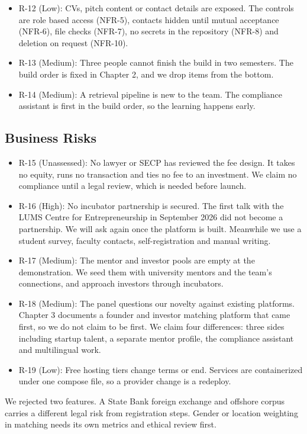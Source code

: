 \documentclass{FastFyp}
\begin{document}
\begin{itemize}
    \item R-12 (Low): CVs, pitch content or contact details are exposed. The controls are role based access (NFR-5), contacts hidden until mutual acceptance (NFR-6), file checks (NFR-7), no secrets in the repository (NFR-8) and deletion on request (NFR-10).
    \item R-13 (Medium): Three people cannot finish the build in two semesters. The build order is fixed in Chapter 2, and we drop items from the bottom.
    \item R-14 (Medium): A retrieval pipeline is new to the team. The compliance assistant is first in the build order, so the learning happens early.
\end{itemize}

\subsection{Business Risks}
\begin{itemize}
    \item R-15 (Unassessed): No lawyer or SECP has reviewed the fee design. It takes no equity, runs no transaction and ties no fee to an investment. We claim no compliance until a legal review, which is needed before launch.
    \item R-16 (High): No incubator partnership is secured. The first talk with the LUMS Centre for Entrepreneurship in September 2026 did not become a partnership. We will ask again once the platform is built. Meanwhile we use a student survey, faculty contacts, self-registration and manual writing.
    \item R-17 (Medium): The mentor and investor pools are empty at the demonstration. We seed them with university mentors and the team's connections, and approach investors through incubators.
    \item R-18 (Medium): The panel questions our novelty against existing platforms. Chapter 3 documents a founder and investor matching platform that came first, so we do not claim to be first. We claim four differences: three sides including startup talent, a separate mentor profile, the compliance assistant and multilingual work.
    \item R-19 (Low): Free hosting tiers change terms or end. Services are containerized under one compose file, so a provider change is a redeploy.
\end{itemize}

We rejected two features. A State Bank foreign exchange and offshore corpus carries a different legal risk from registration steps. Gender or location weighting in matching needs its own metrics and ethical review first.
\end{document}
